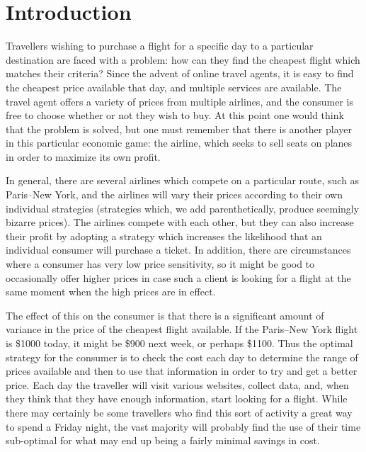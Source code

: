 \documentclass{article}
\title{\thetitle{}}
\author{\theauthors{}}
\begin{document}
\maketitle

\begin{abstract}
  asdfasdfasdf
\end{abstract}

\section{Introduction}

Travellers wishing to purchase a flight for a specific day to a
particular destination are faced with a problem: how can they find the
cheapest flight which matches their criteria?  Since the advent of
online travel agents, it is easy to find the cheapest price available
that day, and multiple services are available.  The travel agent
offers a variety of prices from multiple airlines, and the consumer is
free to choose whether or not they wish to buy.  At this point one
would think that the problem is solved, but one must remember that
there is another player in this particular economic game: the airline,
which seeks to sell seats on planes in order to maximize its own
profit.

In general, there are several airlines which compete on a particular
route, such as Paris--New York, and the airlines will vary their prices
according to their own individual strategies (strategies which, we add
parenthetically, produce seemingly bizarre prices).  The airlines
compete with each other, but they can also increase their profit by
adopting a strategy which increases the likelihood that an individual
consumer will purchase a ticket.  In addition, there are circumstances
where a consumer has very low price sensitivity, so it might be good
to occasionally offer higher prices in case such a client is looking
for a flight at the same moment when the high prices are in effect.

The effect of this on the consumer is that there is a significant
amount of variance in the price of the cheapest flight available.  If
the Paris--New York flight is \$1000 today, it might be \$900 next
week, or perhaps \$1100.  Thus the optimal strategy for the consumer
is to check the cost each day to determine the range of prices
available and then to use that information in order to try and get a
better price.  Each day the traveller will visit various websites,
collect data, and, when they think that they have enough information,
start looking for a flight.  While there may certainly be some
travellers who find this sort of activity a great way to spend a
Friday night, the vast majority will probably find the use of their
time sub-optimal for what may end up being a fairly minimal savings in
cost.
\end{document}
